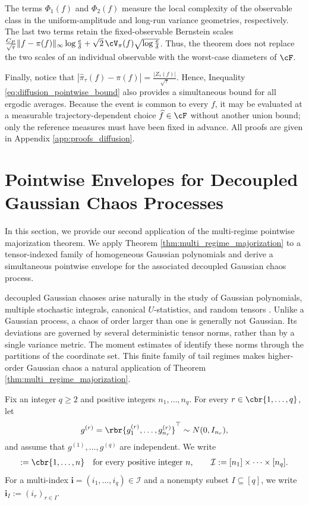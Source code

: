 \documentclass[11pt]{article}
\begin{document}
The terms $\Phi_1(f)$ and $\Phi_2(f)$ measure the local complexity of the
observable class in the uniform-amplitude and long-run
variance geometries, respectively. The last two terms retain the fixed-observable
Bernstein scales $\frac{C_P}{\sqrt\tau}
\|f-\pi(f)\|_\infty\log\frac{e}{\delta}
+
\sqrt2\,\cV_\pi(f)
\sqrt{\log\frac{e}{\delta}}$. Thus, the theorem does not replace the two scales of an individual
observable with the worst-case diameters of $\cF$.

Finally, notice that $|\widehat\pi_\tau(f)-\pi(f)|
=
\frac{|Z_\tau(f)|}{\sqrt\tau}$. Hence, Inequality \eqref{eq:diffusion_pointwise_bound} also provides a simultaneous bound
for all ergodic averages. Because the event is common to every $f$, it may
be evaluated at a measurable trajectory-dependent choice
$\widehat f\in\cF$ without another union bound; only the reference measures
must have been fixed in advance. All proofs are given in Appendix
\ref{app:proofs_diffusion}.


\section{Pointwise Envelopes for Decoupled Gaussian Chaos Processes}
\label{sec:higher_order_gaussian_chaos}

In this section, we provide our second application of the multi-regime
pointwise majorization theorem. We apply Theorem
\ref{thm:multi_regime_majorization} to a tensor-indexed family of
homogeneous Gaussian polynomials and derive a simultaneous pointwise
envelope for the associated decoupled Gaussian chaos process.

decoupled Gaussian chaoses arise naturally in the study of Gaussian
polynomials, multiple stochastic integrals, canonical $U$-statistics, and
random tensors
\citep{delapena1999decoupling,major2014multiple,bamberger2022hanson}.
Unlike a Gaussian process, a chaos of order larger than one is generally
not Gaussian. Its deviations are governed by several deterministic tensor
norms, rather than by a single variance metric. The moment estimates of
\citet{latala2006estimates} identify these norms through the partitions of
the coordinate set. This finite family of tail regimes makes higher-order
Gaussian chaos a natural application of Theorem
\ref{thm:multi_regime_majorization}.

Fix an integer $q\ge2$ and positive integers
$n_1,\ldots,n_q$. For every $r\in\cbr{1,\ldots,q}$, let
\begin{align*}
g^{(r)}
=
\rbr{g^{(r)}_1,\ldots,g^{(r)}_{n_r}}^\top
\sim N(0,I_{n_r}),
\end{align*}
and assume that $g^{(1)},\ldots,g^{(q)}$ are independent. We write
\begin{align*}
 [n]
 :=
 \cbr{1,\ldots,n}
 \quad\text{for every positive integer }n,
 \qquad
\mathcal I
:=
[n_1]\times\cdots\times[n_q].
\end{align*}
For a multi-index
$\boldsymbol i=(i_1,\ldots,i_q)\in\mathcal I$ and a nonempty subset
$I\subseteq[q]$, we write $\boldsymbol i_I
:=
(i_r)_{r\in I}$.
\end{document}
